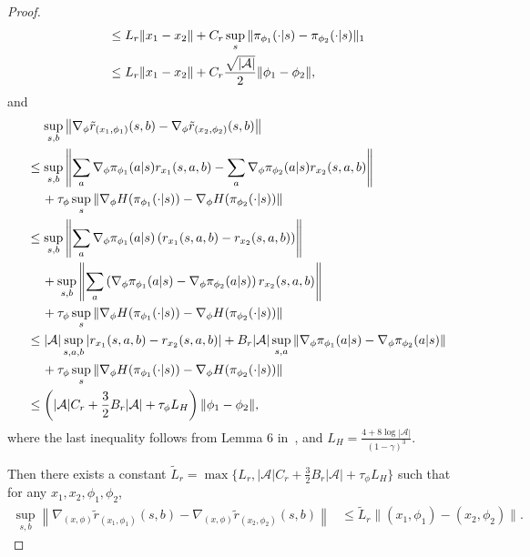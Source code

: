 \documentclass{article}
\theoremstyle{plain}
\theoremstyle{definition}
\theoremstyle{remark}
\def\cA{\mathcal A}
\begin{document}
\begin{proof}
\begin{align}
        & \leq L_r \| x_1 - x_2 \| + C_r \sup_{s} \| \pi_{\phi_1}(\cdot|s) - \pi_{\phi_2}(\cdot|s) \|_1 \notag\\
        & \leq L_r \| x_1 - x_2 \| + C_r \frac{\sqrt{|\cA|}}{2} \| \phi_1 - \phi_2 \| ,
    \end{align}
    and 
    \begin{align}
        & \quad \, \sup_{s,b} \left\| \nabla_{\phi} \tilde{r}_{(x_1,\phi_1)}(s,b) -\nabla_{\phi} \tilde{r}_{(x_2,\phi_2)}(s,b) \right\| \notag \\
        & \leq \sup_{s,b}\left\| \sum_a  \nabla_\phi \pi_{\phi_1}(a|s) r_{x_1}(s,a,b) - \sum_a  \nabla_\phi \pi_{\phi_2}(a|s) r_{x_2}(s,a,b) \right\|  \notag\\
        & \quad \, + \tau_\phi \sup_{s}\left\|   \nabla_\phi H(\pi_{\phi_1}(\cdot|s)) - \nabla_\phi H(\pi_{\phi_2}(\cdot|s)) \right\| \notag\\
        & \leq \sup_{s,b}\left\| \sum_a  \nabla_\phi \pi_{\phi_1}(a|s) \left( r_{x_1}(s,a,b) - r_{x_2}(s,a,b) \right) \right\| \notag  \\
        & \quad \, + \sup_{s,b}\left\| \sum_a  \left( \nabla_\phi \pi_{\phi_1}(a|s) - \nabla_\phi \pi_{\phi_2}(a|s) \right) r_{x_2}(s,a,b) \right\|  \notag \\
        & \quad \, + \tau_\phi \sup_{s}\left\| \nabla_\phi H(\pi_{\phi_1}(\cdot|s)) - \nabla_\phi H(\pi_{\phi_2}(\cdot|s)) \right\|\notag \\
        & \leq |\cA|\sup_{s,a,b} \left|  r_{x_1}(s,a,b) - r_{x_2}(s,a,b)\right| + B_r |\cA| \sup_{s,a} \| \nabla_{\phi} \pi_{\phi_1}(a|s) - \nabla_\phi \pi_{\phi_2}(a|s) \|\notag \\
        & \quad \, + \tau_\phi \sup_{s}\left\| \nabla_\phi H(\pi_{\phi_1}(\cdot|s)) - \nabla_\phi H(\pi_{\phi_2}(\cdot|s)) \right\| \notag\\
        & \leq \left( |\cA| C_r + \frac{3}{2}B_r |\cA| + \tau_\phi L_H\right) \|\phi_1 - \phi_2 \| ,
    \end{align}
    where the last inequality follows from Lemma 6 in~\citet{zeng2022regularized}, and $L_H = \frac{4 + 8\log |\cA|}{(1-\gamma)^3}$.

    Then there exists a constant $\widetilde{L}_r = \max \{ L_r, |\cA| C_r + \frac{3}{2}B_r |\cA| + \tau_\phi L_H \}$ such that for any $x_1,x_2,\phi_1,\phi_2$,
    \begin{align}
        \sup_{s,b} \left\| \nabla_{(x,\phi)} \tilde{r}_{(x_1,\phi_1)}(s,b) -\nabla_{(x,\phi)} \tilde{r}_{(x_2,\phi_2)}(s,b) \right\| & \leq \widetilde{L}_r \| (x_1,\phi_1) - (x_2,\phi_2) \| .
    \end{align}


\end{proof}
\end{document}
